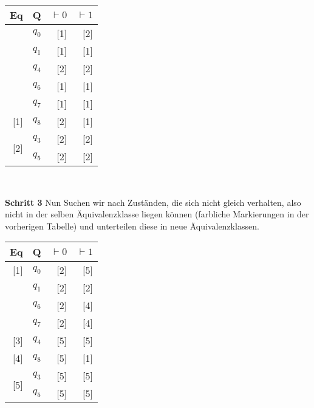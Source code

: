 \documentclass[main.tex]{subfiles}
\begin{document}
\begin{table}[ht]
\centering
\begin{tabular}{r|r|r|r}
     Eq & Q & $\vdash 0$ & $\vdash 1$ \\
     \hline
                         & \cellcolor{yellow!20} $q_0$ & \cellcolor{yellow!20} [1] & \cellcolor{yellow!20} [2] \\
                         & \cellcolor{blue!20} $q_1$ & \cellcolor{blue!20} [1] & \cellcolor{blue!20} [1] \\    
                         & \cellcolor{orange!20} $q_4$ & \cellcolor{orange!20} [2] & \cellcolor{orange!20} [2] \\    
                         & \cellcolor{blue!20} $q_6$ & \cellcolor{blue!20} [1] & \cellcolor{blue!20} [1] \\    
                         & \cellcolor{blue!20} $q_7$ & \cellcolor{blue!20} [1] & \cellcolor{blue!20} [1] \\    
     \multirow{-6}{*}{[1]} & \cellcolor{red!20} $q_8$ & \cellcolor{red!20} [2] & \cellcolor{red!20} [1] \\
     \hline
     \multirow{2}{*}{[2]}
                         & $q_3$ & [2] & [2] \\    
                         & $q_5$ & [2] & [2] \\    
\end{tabular}\\
\end{table}

\textbf{Schritt 3} Nun Suchen wir nach Zuständen, die sich nicht gleich verhalten, also nicht in der selben Äquivalenzklasse liegen können (farbliche Markierungen in der vorherigen Tabelle) und unterteilen diese in neue Äquivalenzklassen.

\begin{table}[ht]
\centering
\begin{tabular}{r|r|r|r}
    Eq & Q & $\vdash 0$ & $\vdash 1$ \\
    \hline
    \cellcolor{yellow!20} [1] & $q_0$ & [2] & [5] \\
    \hline
    \cellcolor{blue!20}
    & $q_1$ & [2] & [2] \\    
    \cellcolor{blue!20}
    & $q_6$ & [2] & [4] \\    
    \cellcolor{blue!20}
    \multirow{-3}{*}{[2]} & $q_7$ & [2] & [4] \\    
    \hline
    \cellcolor{orange!20}
    [3] & $q_4$ & [5] & [5] \\    
    \hline
    \cellcolor{red!20}
    [4] & $q_8$ & [5] & [1] \\
    \hline
    \multirow{2}{*}{[5]}
                         & $q_3$ & [5] & [5] \\    
                         & $q_5$ & [5] & [5] \\    
\end{tabular}
\end{table}
\end{document}
